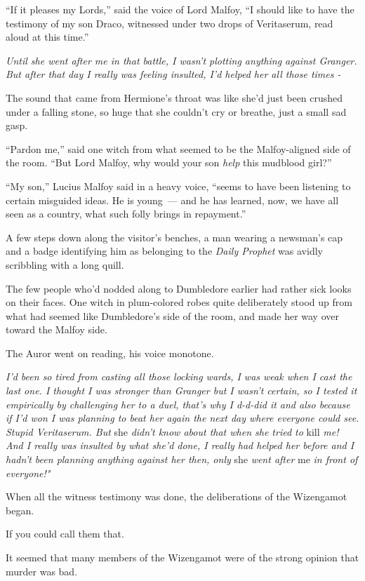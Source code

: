 ``If it pleases my Lords,'' said the voice of Lord Malfoy, ``I should like to have the testimony of my son Draco, witnessed under two drops of Veritaserum, read aloud at this time.''

\emph{Until she went after me in that battle, I wasn't plotting anything against Granger. But after that day I really was feeling insulted, I'd helped her all those times -}

The sound that came from Hermione's throat was like she'd just been crushed under a falling stone, so huge that she couldn't cry or breathe, just a small sad gasp.

``Pardon me,'' said one witch from what seemed to be the Malfoy-aligned side of the room. ``But Lord Malfoy, why would your son \emph{help} this mudblood girl?''

``My son,'' Lucius Malfoy said in a heavy voice, ``seems to have been listening to certain misguided ideas. He is young~--- and he has learned, now, we have all seen as a country, what such folly brings in repayment.''

A few steps down along the visitor's benches, a man wearing a newsman's cap and a badge identifying him as belonging to the \emph{Daily Prophet} was avidly scribbling with a long quill.

The few people who'd nodded along to Dumbledore earlier had rather sick looks on their faces. One witch in plum-colored robes quite deliberately stood up from what had seemed like Dumbledore's side of the room, and made her way over toward the Malfoy side.

The Auror went on reading, his voice monotone.

\emph{I'd been so tired from casting all those locking wards, I was weak when I cast the last one. I thought I was stronger than Granger but I wasn't certain, so I tested it empirically by challenging her to a duel, that's why I d-d-did it and also because if I'd won I was planning to beat her again the next day where everyone could see. Stupid Veritaserum. But} she \emph{didn't know about that when she tried to} kill \emph{me! And I really was insulted by what she'd done, I really had helped her before and I hadn't been planning anything against her then, only} she \emph{went after} me \emph{in front of everyone!"}

When all the witness testimony was done, the deliberations of the Wizengamot began.

If you could call them that.

It seemed that many members of the Wizengamot were of the strong opinion that murder was bad.

